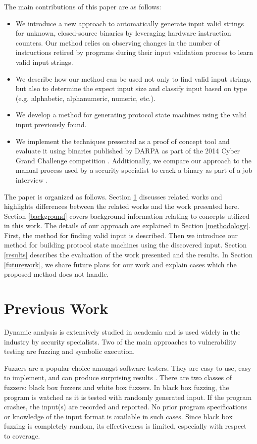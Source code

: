 \documentclass{acm_proc_article-sp}
\begin{document}
The main contributions of this paper are as follows:
\begin{itemize}
	\item We introduce a new approach to automatically generate input valid strings for unknown, closed-source binaries by leveraging hardware instruction counters. Our method relies on observing changes in the number of instructions retired by programs during their input validation process to learn valid input strings.
	\item We describe how our method can be used not only to find valid input strings, but also to determine the expect input size and classify input based on type (e.g. alphabetic, alphanumeric, numeric, etc.).
	\item We develop a method for generating protocol state machines using the valid input previously found.
	\item We implement the techniques presented as a proof of concept tool and evaluate it using binaries published by DARPA as part of the 2014 Cyber Grand Challenge competition \cite{darpacgc}. Additionally, we compare our approach to the manual process used by a security specialist to crack a binary as part of a job interview \cite{interviewbinary}.
\end{itemize}

The paper is organized as follows.
Section \ref{prevwork} discusses related works and highlights differences between the related works and the work presented here.
Section \ref{background} covers background information relating to concepts utilized in this work.
The details of our approach are explained in Section \ref{methodology}. First, the method for finding valid input is described. Then we introduce our method for building protocol state machines using the discovered input.
Section \ref{results} describes the evaluation of the work presented and the results.
In Section \ref{futurework}, we share future plans for our work and explain cases which the proposed method does not handle.


\section{Previous Work} \label{prevwork}
Dynamic analysis is extensively studied in academia and is used widely in the industry by security specialists.
Two of the main approaches to vulnerability testing are fuzzing and symbolic execution.

Fuzzers are a popular choice amongst software testers.
They are easy to use, easy to implement, and can produce surprising results \cite{millerfuzz, millerfuzzrevisited}.
There are two classes of fuzzers: black box fuzzers and white box fuzzers.
In black box fuzzing, the program is watched as it is tested with randomly generated input.
If the program crashes, the input(s) are recorded and reported.
No prior program specifications or knowledge of the input format is available in such cases.
Since black box fuzzing is completely random, its effectiveness is limited, especially with respect to coverage.
\end{document}
